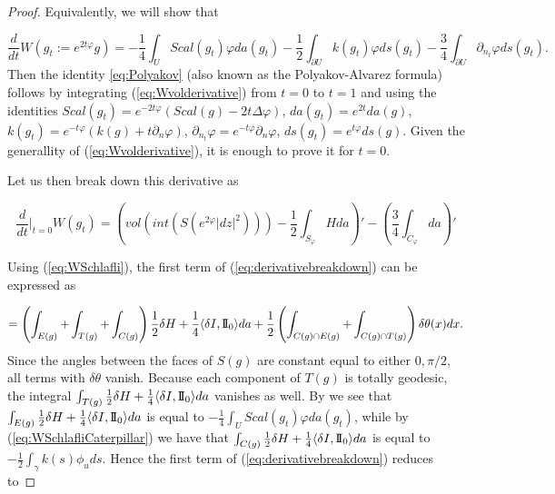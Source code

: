 \documentclass[12pt]{amsart}
\newcommand{\II}{{\rm I}\!{\rm I}}
\begin{document}
\begin{proof}
Equivalently, we will show that

\begin{equation}\label{eq:Wvolderivative}
    \frac{d}{dt} W(g_t:=e^{2t\varphi}g) = -\frac14\int_U  Scal(g_t)\varphi da(g_t) -\frac12\int_{\partial U} k(g_t)\varphi ds(g_t) -\frac34 \int_{\partial U} \partial_{n_t}\varphi ds(g_t).
\end{equation}
Then the identity \ref{eq:Polyakov} (also known as the Polyakov-Alvarez formula) follows by integrating (\ref{eq:Wvolderivative}) from $t=0$ to $t=1$ and using the identities $Scal(g_t) = e^{-2t\varphi}(Scal(g) - 2t\Delta\varphi)$, $da(g_t) = e^{2t}da(g)$, $k(g_t)=e^{-t\varphi}(k(g)+t\partial_n\varphi)$, $\partial_{n_t}\varphi = e^{-t\varphi}\partial_{n}\varphi$, $ds(g_t)=e^{t\varphi}ds(g)$. Given the generallity of (\ref{eq:Wvolderivative}), it is enough to prove it for $t=0$.

Let us then break down this derivative as

\begin{equation}\label{eq:derivativebreakdown}
\frac{d}{dt}\bigg\vert_{t=0} W(g_t) = \left(vol(int(S(e^{2\varphi}|dz|^2))) -\frac12 \int_{S_\varphi} Hda\right)' - \left(\frac34 \int_{C_\varphi} da\right)'
\end{equation}

Using (\ref{eq:WSchlafli}), the first term of (\ref{eq:derivativebreakdown}) can be expressed as

\begin{equation}
    = \left(\int_{E(g)} + \int_{T(g)} + \int_{C(g)}\right) \frac12\delta H + \frac14\langle \delta I, \II_0 \rangle da + \frac12\left(\int_{C(g)\cap E(g)} + \int_{C(g)\cap T(g)}\right) \delta\theta(x)dx.
\end{equation}
Since the angles between the faces of $S(g)$ are constant equal to either $0,\pi/2$, all terms with $\delta\theta$ vanish. Because each component of $T(g)$ is totally geodesic, the integral  $\int_{T(g)}\frac12\delta H + \frac14\langle \delta I, \II_0 \rangle da$ vanishes as well. By \cite[Corollary 6.2]{KrasnovSchlenker08} we see that $\int_{E(g)}\frac12\delta H + \frac14\langle \delta I, \II_0 \rangle da$ is equal to $-\frac14\int_U  Scal(g_t)\varphi da(g_t)$, while by (\ref{eq:WSchlafliCaterpillar}) we have that $\int_{C(g)}\frac12\delta H + \frac14\langle \delta I, \II_0 \rangle da$ is equal to $-\frac12 \int_\gamma k(s)\phi_u ds$. Hence the first term of (\ref{eq:derivativebreakdown}) reduces to


\end{proof}
\end{document}
